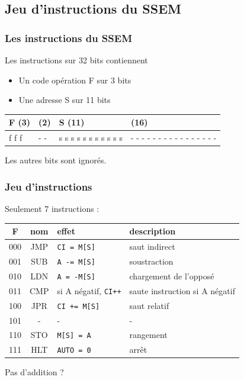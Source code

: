 \documentclass{beamer}
\begin{document}
\subsection{Jeu d'instructions du SSEM}
\begin{frame}
\frametitle{Les instructions du SSEM}

Les instructions sur 32 bits contiennent
\begin{itemize}
\item Un \alert{code opération} F sur 3 bits
\item Une \alert{adresse} S sur 11 bits
\end{itemize}

\vfill 
\begin{tabular}{|l|l|l|l|}
\hline
F (3) &  (2) & S (11)  &  (16) \\
\hline
f f f  & - - & s s s s s s s s s s s & - - - - - - - - - - - - - - - - \\
\hline
\end{tabular}

\vfill
Les autres bits sont ignorés.
\end{frame}

\begin{frame}
\frametitle{Jeu d'instructions}

Seulement 7 instructions :
\vfill
\begin{tabular}{|c|c|l|l|}
\hline
F & nom & effet & description  \\
\hline
000 & JMP &  \texttt{CI = M[S]} & saut indirect \\
001 & SUB &  \texttt{A -= M[S]} & soustraction \\
010 & LDN &  \texttt{A = -M[S]} & chargement de l'opposé \\
011 & CMP &  si A négatif,  \texttt{CI++} & saute instruction si A négatif \\
100 & JPR &  \texttt{CI += M[S]} & saut relatif \\
101 & - & - & - \\
110 & STO &  \texttt{M[S] = A} & rangement \\
111 & HLT &  \texttt{AUTO = 0} & arrêt \\
\hline 
\end{tabular}
\vfill
Pas d'addition ?
\end{frame}
\end{document}
